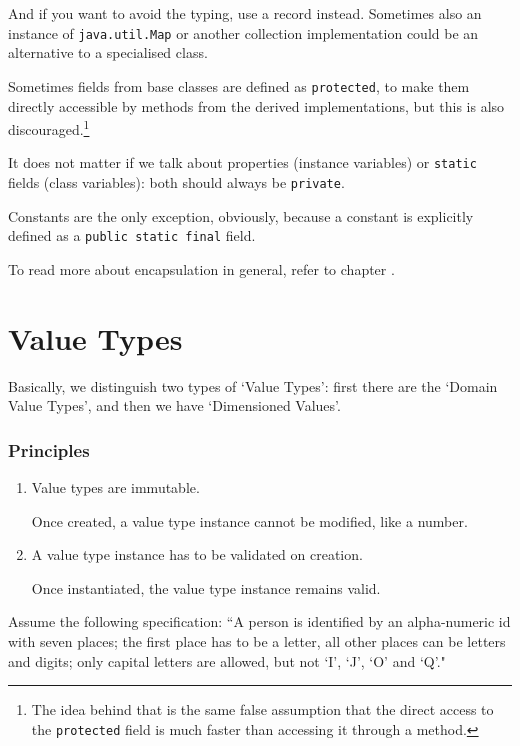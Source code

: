And if you want to avoid the typing, use a record\autocite{ORACLE_DOC_RECORD,ORACLE_DOC_LANGUAGE_SPECIFICATION:RecordClasses,Eckel:JavaRecords}  instead. Sometimes also an instance of \lstinline|java.util.Map| or another collection implementation could be an alternative to a specialised class.
 
Sometimes fields from base classes are defined as \lstinline|protected|, to make them directly accessible by methods from the derived implementations, but this is also discouraged.\footnote{The idea behind that is the same false assumption that the direct access to the \lstinline|protected| field is much faster than accessing it through a method.}

It does not matter if we talk about properties (instance variables) or \lstinline|static| fields (class variables): both should always be \lstinline|private|.

Constants are the only exception, obviously, because a constant is explicitly defined as a \lstinline|public static final| field.

To read more about encapsulation in general, refer to chapter .


\section{Value Types}\label{sec:ValueTypes}
Basically, we distinguish two types of ‘Value Types’: first there are the ‘Domain Value Types’, and then we have ‘Dimensioned Values’.

\subsubsection{Principles}
\begin{enumerate}[label=P\arabic*.]
\item{Value types are immutable.

Once created, a value type instance cannot be modified, like a number.}

\item{A value type instance has to be validated on creation.

Once instantiated, the value type instance remains valid.}
\end{enumerate}

Assume the following specification: “A person is identified by an alpha-numeric id with seven places; the first place has to be a letter, all other places can be letters and digits; only capital letters are allowed, but not ‘I’, ‘J’, ‘O’ and ‘Q’."

